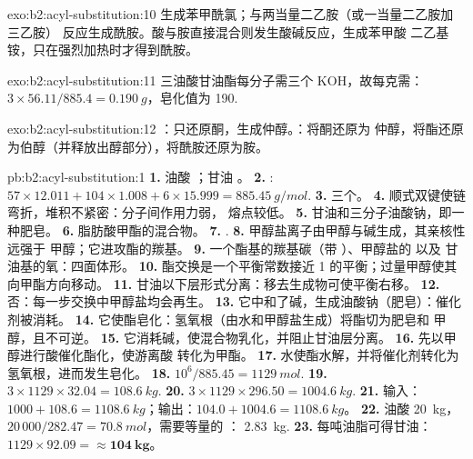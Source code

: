 \begin{solution}{exo:b2:acyl-substitution:10}
 生成苯甲酰氯；与两当量二乙胺（或一当量二乙胺加三乙胺）
反应生成酰胺。酸与胺直接混合则发生酸碱反应，生成苯甲酸
二乙基铵，只在强烈加热时才得到酰胺。
\end{solution}

\begin{solution}{exo:b2:acyl-substitution:11}
三油酸甘油酯每分子需三个 KOH，故每克需：$3 \times 56.11/885.4 = \qty{0.190}{g}$，皂化值为
190.
\end{solution}

\begin{solution}{exo:b2:acyl-substitution:12}
：只还原酮，生成仲醇。：将酮还原为
仲醇，将酯还原为伯醇（并释放出醇部分），将酰胺还原为胺。
\end{solution}

\begin{solution}{pb:b2:acyl-substitution:1}
\textbf{1.} 油酸 ；甘油 。
\textbf{2.} : $57 \times 12.011 + 104 \times 1.008 + 6 \times 15.999 = \qty{885.45}{g/mol}$.
\textbf{3.} 三个。
\textbf{4.} 顺式双键使链弯折，堆积不紧密：分子间作用力弱，
熔点较低。
\textbf{5.} 甘油和三分子油酸钠，即一种肥皂。
\textbf{6.} 脂肪酸甲酯的混合物。
\textbf{7.} .
\textbf{8.} 甲醇盐离子由甲醇与碱生成，其亲核性远强于
甲醇；它进攻酯的羰基。
\textbf{9.} 一个酯基的羰基碳（带 ）、甲醇盐的  以及
甘油基的氧：四面体形。
\textbf{10.} 酯交换是一个平衡常数接近 1 的平衡；过量甲醇使其
向甲酯方向移动。
\textbf{11.} 甘油以下层形式分离：移去生成物可使平衡右移。
\textbf{12.} 否：每一步交换中甲醇盐均会再生。
\textbf{13.} 它中和了碱，生成油酸钠（肥皂）：催化剂被消耗。
\textbf{14.} 它使酯皂化：氢氧根（由水和甲醇盐生成）将酯切为肥皂和
甲醇，且不可逆。
\textbf{15.} 它消耗碱，使混合物乳化，并阻止甘油层分离。
\textbf{16.} 先以甲醇进行酸催化酯化，使游离酸
转化为甲酯。
\textbf{17.} 水使酯水解，并将催化剂转化为氢氧根，进而发生皂化。
\textbf{18.} $10^6/885.45 = \qty{1129}{mol}$.
\textbf{19.} $3 \times 1129 \times 32.04 = \qty{108.6}{kg}$.
\textbf{20.} $3 \times 1129 \times 296.50 = \qty{1004.6}{kg}$.
\textbf{21.} 输入：$1000 + 108.6 = \qty{1108.6}{kg}$；输出：$104.0 + 1004.6 = \qty{1108.6}{kg}$。
\textbf{22.} 油酸 \qty{20}{kg}，$20\,000/282.47 = \qty{70.8}{mol}$，需要等量的 ：
\qty{2.83}{kg}.
\textbf{23.} 每吨油脂可得甘油：$1129 \times 92.09 = \boldsymbol{\approx \qty{104}{kg}}$。
\end{solution}
